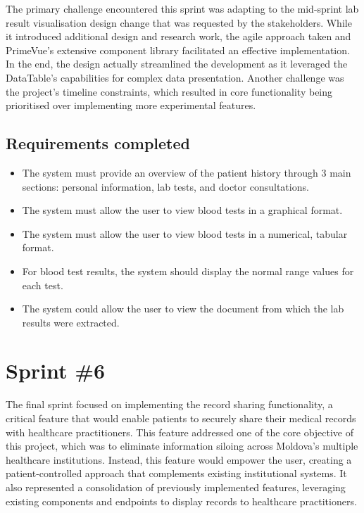 The primary challenge encountered this sprint was adapting to the mid-sprint lab result visualisation design change that was requested by the stakeholders. While it introduced additional design and research work, the agile approach taken and PrimeVue's extensive component library facilitated an effective implementation. In the end, the design actually streamlined the development as it leveraged the DataTable's capabilities for complex data presentation. Another challenge was the project's timeline constraints, which resulted in core functionality being prioritised over implementing more experimental features.

\subsection{Requirements completed}

\begin{itemize}
  \item The system must provide an overview of the patient history through 3 main sections: personal information, lab tests, and doctor consultations.
  \item The system must allow the user to view blood tests in a graphical format.
  \item The system must allow the user to view blood tests in a numerical, tabular format.
  \item For blood test results, the system should display the normal range values for each test.
  \item The system could allow the user to view the document from which the lab results were extracted.
\end{itemize}

\section{Sprint \#6}

The final sprint focused on implementing the record sharing functionality, a critical feature that would enable patients to securely share their medical records with healthcare practitioners. This feature addressed one of the core objective of this project, which was to eliminate information siloing across Moldova's multiple healthcare institutions. Instead, this feature would empower the user, creating a patient-controlled approach that complements existing institutional systems. It also represented a consolidation of previously implemented features, leveraging existing components and endpoints to display records to healthcare practitioners. 

